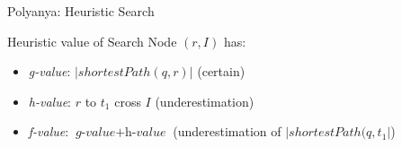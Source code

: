 \begin{frame}{Polyanya: Heuristic Search}
\begin{minipage}{.4\textwidth}
\small Heuristic value of Search Node $(r, I)$ has:
\begin{itemize}
    \item \small \textit{g-value}: $|shortestPath(q, r)|$ (certain)
    \item \small \textit{h-value}: $r$ to $t_1$ cross $I$ (underestimation)
    \item \small \textit{f-value}: $\textit{g-value} + \textit{h-value}$ (underestimation of $|shortestPath(q, t_1|$)
\end{itemize}
\end{minipage}%
\begin{minipage}{.6\textwidth}
    \begin{adjustbox}{max totalsize={.9\textwidth}{.9\textheight}, right}
    \end{adjustbox}
\end{minipage}
\end{frame}

